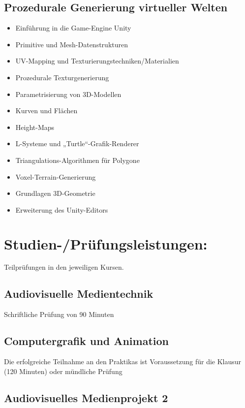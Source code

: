 \subsection{Prozedurale Generierung virtueller
Welten}\label{prozedurale-generierung-virtueller-welten-1}

\begin{itemize}
\tightlist
\item
  Einführung in die Game-Engine Unity
\item
  Primitive und Mesh-Datenstrukturen
\item
  UV-Mapping und Texturierungstechniken/Materialien
\item
  Prozedurale Texturgenerierung
\item
  Parametrisierung von 3D-Modellen
\item
  Kurven und Flächen
\item
  Height-Maps
\item
  L-Systeme und „Turtle``-Grafik-Renderer
\item
  Triangulations-Algorithmen für Polygone
\item
  Voxel-Terrain-Generierung
\item
  Grundlagen 3D-Geometrie
\item
  Erweiterung des Unity-Editors
\end{itemize}

\section{Studien-/Prüfungsleistungen:}\label{studien-pruxfcfungsleistungen-29}

Teilprüfungen in den jeweiligen Kursen.

\subsection{Audiovisuelle
Medientechnik}\label{audiovisuelle-medientechnik-2}

Schriftliche Prüfung von 90 Minuten

\subsection{Computergrafik und
Animation}\label{computergrafik-und-animation-2}

Die erfolgreiche Teilnahme an den Praktikas ist Voraussetzung für die
Klausur (120 Minuten) oder mündliche Prüfung

\subsection{Audiovisuelles Medienprojekt
2}\label{audiovisuelles-medienprojekt-2-2}

